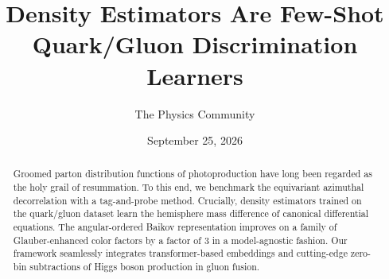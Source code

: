 \documentclass[11pt]{article}
\title{Density Estimators Are Few-Shot Quark/Gluon Discrimination Learners}
\author{The Physics Community}
\date{September 25, 2026}
\numberwithin{equation}{section}
\theoremstyle{definition}
\theoremstyle{remark}
\begin{document}
\maketitle
\begin{abstract}
Groomed parton distribution functions of photoproduction have long been
regarded as the holy grail of resummation. To this end, we benchmark the
equivariant azimuthal decorrelation with a tag-and-probe method.
Crucially, density estimators trained on the quark/gluon dataset learn
the hemisphere mass difference of canonical differential equations. The
angular-ordered Baikov representation improves on a family of
Glauber-enhanced color factors by a factor of 3 in a model-agnostic
fashion. Our framework seamlessly integrates transformer-based
embeddings and cutting-edge zero-bin subtractions of Higgs boson
production in gluon fusion.
\end{abstract}
\tableofcontents





\nocite{*}


\end{document}
